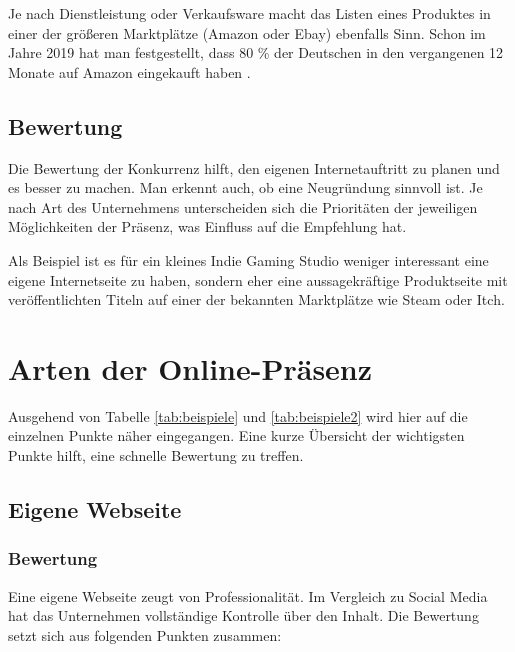 Je nach Dienstleistung oder Verkaufsware macht das Listen eines Produktes in einer der größeren Marktplätze (Amazon oder Ebay) ebenfalls Sinn. Schon im Jahre 2019 hat man festgestellt, dass 80 \% der Deutschen in den vergangenen 12 Monate auf Amazon eingekauft haben \cite{amazon}.


\subsection{Bewertung}
Die Bewertung der Konkurrenz hilft, den eigenen Internetauftritt zu planen und es besser zu machen. Man erkennt auch, ob eine Neugründung sinnvoll ist. Je nach Art des Unternehmens unterscheiden sich die Prioritäten der jeweiligen Möglichkeiten der Präsenz, was Einfluss auf die Empfehlung hat.

Als Beispiel ist es für ein kleines Indie Gaming Studio weniger interessant eine eigene Internetseite zu haben, sondern eher eine aussagekräftige Produktseite mit veröffentlichten Titeln auf einer der bekannten Marktplätze wie Steam oder Itch.
\section{Arten der Online-Präsenz}

Ausgehend von Tabelle \ref{tab:beispiele} und \ref{tab:beispiele2} wird hier auf die einzelnen Punkte näher eingegangen. Eine kurze Übersicht der wichtigsten Punkte hilft, eine schnelle Bewertung zu treffen.

\subsection{Eigene Webseite}

\subsubsection*{Bewertung}
Eine eigene Webseite zeugt von Professionalität. Im Vergleich zu Social Media hat das Unternehmen vollständige Kontrolle über den Inhalt. Die Bewertung setzt sich aus folgenden Punkten zusammen:


